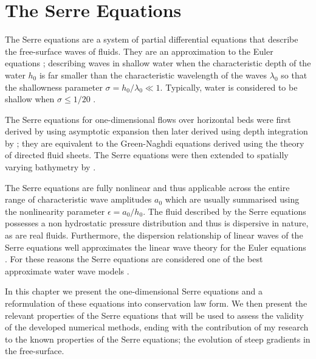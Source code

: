 
\chapter{The Serre Equations}
\label{chp:Serreeqns}
The Serre equations are a system of partial differential equations that describe the free-surface waves of fluids. They are an approximation to the Euler equations \cite{Euler-1755-274}; describing waves in shallow water when the characteristic depth of the water $h_0$ is far smaller than the characteristic wavelength of the waves $\lambda_0$ so that the shallowness parameter $ \sigma = h_0 / \lambda_0  \ll 1 $. Typically, water is considered to be shallow when $\sigma  \le  1/ 20$ \cite{Sorenson-2006}.  

The Serre equations for one-dimensional flows over horizontal beds were first derived by \citet{Serre-F-1953-857} using asymptotic expansion then later derived using depth integration by \citet{Su-Gardener-1969-536}; they are equivalent to the Green-Naghdi equations \cite{Green-Naghdi-1976-237} derived using the theory of directed fluid sheets. The Serre equations were then extended to spatially varying bathymetry by \citet{Seabra-Santos-etal-1987-117}. 

The Serre equations are fully nonlinear and thus applicable across the entire range of characteristic wave amplitudes $a_0$ which are usually summarised using the nonlinearity parameter $\epsilon = a_0 / h_0$. The fluid described by the Serre equations possesses a non hydrostatic pressure distribution and thus is dispersive in nature, as are real fluids. Furthermore, the dispersion relationship of linear waves of the Serre equations well approximates the linear wave theory for the Euler equations \cite{Barthelemy-2004-315}. For these reasons the Serre equations are considered one of the best approximate water wave models \cite{Bonneton-Lannes-2009-16601,Bonneton-etal-2011-1479}. 

In this chapter we present the one-dimensional Serre equations and a reformulation of these equations into conservation law form. We then present the relevant properties of the Serre equations that will be used to assess the validity of the developed numerical methods, ending with the contribution of my research to the known properties of the Serre equations; the evolution of steep gradients in the free-surface. 

